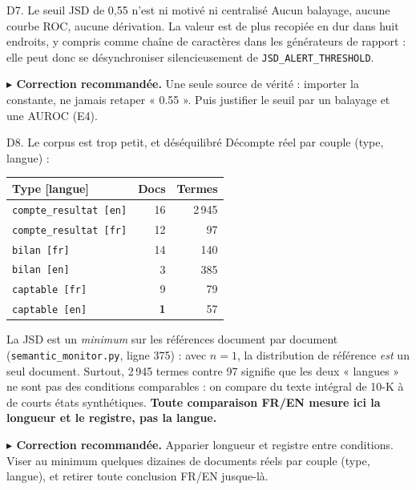 \documentclass[11pt,a4paper]{article}
\newcommand{\corr}[1]{%
  \par\vspace{4pt}%
  \noindent\textbf{\textcolor{cExp}{$\blacktriangleright$ Correction recommandée.}} #1%
}
\newcommand{\fic}[1]{\texttt{\small #1}}
\begin{document}
\begin{serieux}{D7. Le seuil JSD de 0,55 n'est ni motivé ni centralisé}
Aucun balayage, aucune courbe ROC, aucune dérivation. La valeur est de plus
recopiée en dur dans huit endroits, y compris comme chaîne de caractères dans
les générateurs de rapport : elle peut donc se désynchroniser silencieusement de
\fic{JSD\_ALERT\_THRESHOLD}.

\corr{Une seule source de vérité : importer la constante, ne jamais retaper
« 0.55 ». Puis justifier le seuil par un balayage et une AUROC (E4).}
\end{serieux}

\begin{serieux}{D8. Le corpus est trop petit, et déséquilibré}
Décompte réel par couple (type, langue) :

\begin{center}
\begin{tabular}{@{}lrr@{}}
\toprule
\textbf{Type [langue]} & \textbf{Docs} & \textbf{Termes} \\
\midrule
\fic{compte\_resultat [en]} & 16 & 2\,945 \\
\fic{compte\_resultat [fr]} & 12 & 97 \\
\fic{bilan [fr]}            & 14 & 140 \\
\fic{bilan [en]}            & 3  & 385 \\
\fic{captable [fr]}         & 9  & 79 \\
\fic{captable [en]}         & \textbf{1} & 57 \\
\bottomrule
\end{tabular}
\end{center}

La JSD est un \emph{minimum} sur les références document par document
(\fic{semantic\_monitor.py}, ligne 375) : avec $n = 1$, la distribution de
référence \emph{est} un seul document. Surtout, 2\,945 termes contre 97 signifie
que les deux « langues » ne sont pas des conditions comparables : on compare du
texte intégral de 10-K à de courts états synthétiques. \textbf{Toute comparaison
FR/EN mesure ici la longueur et le registre, pas la langue.}

\corr{Apparier longueur et registre entre conditions. Viser au minimum quelques
dizaines de documents réels par couple (type, langue), et retirer toute
conclusion FR/EN jusque-là.}
\end{serieux}
\end{document}
